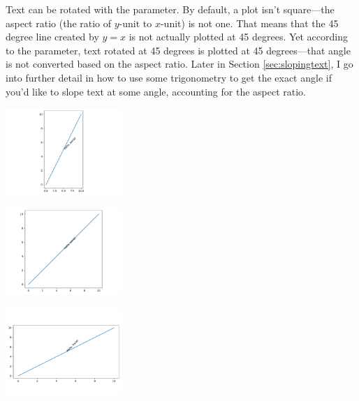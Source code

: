 Text can be rotated with the  parameter. By default, a plot isn't square---the aspect ratio (the ratio of $y$-unit to $x$-unit) is not one. That means that the 45 degree line created by $y=x$ is not actually plotted at 45 degrees. Yet according to the  parameter, text rotated at 45 degrees is plotted at 45 degrees---that angle is not converted based on the aspect ratio. Later in Section \ref{sec:slopingtext}, I go into further detail in how to use some trigonometry to get the exact angle if you'd like to slope text at some angle, accounting for the aspect ratio. 



\begin{center}
    \includegraphics[width = 0.33\textwidth]{figures/proseplots/text-rotation2.pdf}
\end{center} \begin{center}
    \includegraphics[width = 0.33\textwidth]{figures/proseplots/text-rotation1.pdf}
\end{center} \begin{center}
    \includegraphics[width = 0.33\textwidth]{figures/proseplots/text-rotation05.pdf}
\end{center}




